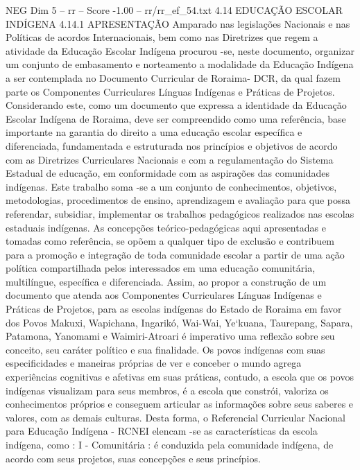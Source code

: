 \begin{textsample}{NEG Dim 5 – rr – Score -1.00 – rr/rr\_ef\_54.txt}  \label{ex:f5_neg_062}
4.14 EDUCAÇÃO ESCOLAR INDÍGENA 4.14.1 APRESENTAÇÃO Amparado nas legislações Nacionais e nas Políticas de acordos Internacionais, bem como nas Diretrizes que regem a atividade da Educação Escolar Indígena procurou -se, neste documento, organizar um conjunto de embasamento e norteamento a modalidade da Educação Indígena a ser contemplada no Documento Curricular de Roraima- DCR, da qual fazem parte os Componentes Curriculares Línguas Indígenas e Práticas de Projetos.
Considerando este, como um documento que expressa a identidade da Educação Escolar Indígena de Roraima, deve ser compreendido como uma referência, base importante na garantia do direito a uma educação escolar específica e diferenciada, fundamentada e estruturada nos princípios e objetivos de acordo com as Diretrizes Curriculares Nacionais e com a regulamentação do Sistema Estadual de educação, em conformidade com as aspirações das comunidades indígenas.
Este trabalho soma -se a um conjunto de conhecimentos, objetivos, metodologias, procedimentos de ensino, aprendizagem e avaliação para que possa referendar, subsidiar, implementar os trabalhos pedagógicos realizados nas escolas estaduais indígenas.
As concepções teórico-pedagógicas aqui apresentadas e tomadas como referência, se opõem a qualquer tipo de exclusão e contribuem para a promoção e integração de toda comunidade escolar a partir de uma ação política compartilhada pelos interessados em uma educação comunitária, multilíngue, específica e diferenciada.
Assim, ao propor a construção de um documento que atenda aos Componentes Curriculares Línguas Indígenas e Práticas de Projetos, para as escolas indígenas do Estado de Roraima em favor dos Povos Makuxi, Wapichana, Ingarikó, Wai-Wai, Ye‘kuana, Taurepang, Sapara, Patamona, Yanomami e Waimiri-Atroari é imperativo uma reflexão sobre seu conceito, seu caráter político e sua finalidade.
Os povos indígenas com suas especificidades e maneiras próprias de ver e conceber o mundo agrega experiências cognitivas e afetivas em suas práticas, contudo, a escola que os povos indígenas visualizam para seus membros, é a escola que constrói, valoriza os conhecimentos próprios e conseguem articular as informações sobre seus saberes e valores, com as demais culturas.
Desta forma, o Referencial Curricular Nacional para Educação Indígena - RCNEI elencam -se as características da escola indígena, como : I - Comunitária : é conduzida pela comunidade indígena, de acordo com seus projetos, suas concepções e seus princípios.

\end{textsample}
